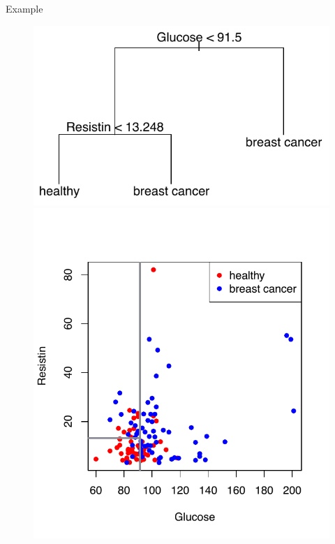 \documentclass[notes]{beamer}          %
\begin{document}
\begin{frame}{Example}
 \begin{figure}
  \includegraphics[width=\linewidth]{../figures/week_6/breast_cancer_tree.pdf}  
\endminipage\hfill
{}%
  \includegraphics[width=\linewidth]{../figures/week_6/breast_cancer_2Dscatterplot_vhlines.pdf}  
\endminipage
\end{figure}
\end{frame}
\end{document}
